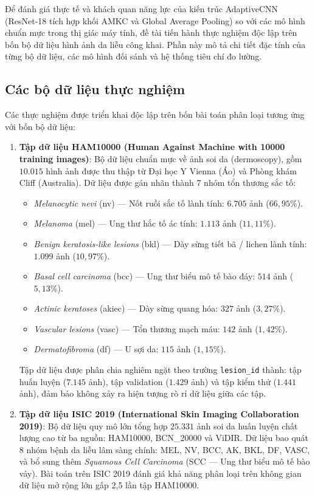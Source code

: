 Để đánh giá thực tế và khách quan năng lực của kiến trúc AdaptiveCNN (ResNet-18 tích hợp khối AMKC và Global Average Pooling) so với các mô hình chuẩn mực trong thị giác máy tính, đề tài tiến hành thực nghiệm độc lập trên bốn bộ dữ liệu hình ảnh da liễu công khai. Phần này mô tả chi tiết đặc tính của từng bộ dữ liệu, các mô hình đối sánh và hệ thống tiêu chí đo lường.

\subsection{Các bộ dữ liệu thực nghiệm}

Các thực nghiệm được triển khai độc lập trên bốn bài toán phân loại tương ứng với bốn bộ dữ liệu:

\begin{enumerate}[label=\textbf{\arabic*.}]
  \item \textbf{Tập dữ liệu HAM10000 (Human Against Machine with 10000 training images)}: 
  Bộ dữ liệu chuẩn mực về ảnh soi da (dermoscopy), gồm $10.015$ hình ảnh được thu thập từ Đại học Y Vienna (Áo) và Phòng khám Cliff (Australia). Dữ liệu được gán nhãn thành 7 nhóm tổn thương sắc tố:
  \begin{itemize}
    \item \textit{Melanocytic nevi} (nv) --- Nốt ruồi sắc tố lành tính: $6.705$ ảnh ($66{,}95\%$).
    \item \textit{Melanoma} (mel) --- Ung thư hắc tố ác tính: $1.113$ ảnh ($11{,}11\%$).
    \item \textit{Benign keratosis-like lesions} (bkl) --- Dày sừng tiết bã / lichen lành tính: $1.099$ ảnh ($10{,}97\%$).
    \item \textit{Basal cell carcinoma} (bcc) --- Ung thư biểu mô tế bào đáy: $514$ ảnh ($5{,}13\%$).
    \item \textit{Actinic keratoses} (akiec) --- Dày sừng quang hóa: $327$ ảnh ($3{,}27\%$).
    \item \textit{Vascular lesions} (vasc) --- Tổn thương mạch máu: $142$ ảnh ($1{,}42\%$).
    \item \textit{Dermatofibroma} (df) --- U sợi da: $115$ ảnh ($1{,}15\%$).
  \end{itemize}
  Tập dữ liệu được phân chia nghiêm ngặt theo trường \texttt{lesion\_id} thành: tập huấn luyện ($7.145$ ảnh), tập validation ($1.429$ ảnh) và tập kiểm thử ($1.441$ ảnh), đảm bảo không xảy ra hiện tượng rò rỉ dữ liệu giữa các tập.

  \item \textbf{Tập dữ liệu ISIC 2019 (International Skin Imaging Collaboration 2019)}:
  Bộ dữ liệu quy mô lớn tổng hợp $25.331$ ảnh soi da huấn luyện chất lượng cao từ ba nguồn: HAM10000, BCN\_20000 và ViDIR. Dữ liệu bao quát 8 nhóm bệnh da liễu lâm sàng chính: MEL, NV, BCC, AK, BKL, DF, VASC, và bổ sung thêm \textit{Squamous Cell Carcinoma} (SCC --- Ung thư biểu mô tế bào vảy). Bài toán trên ISIC 2019 đánh giá khả năng phân loại trên không gian dữ liệu mở rộng lớn gấp 2,5 lần tập HAM10000.


\end{enumerate}
